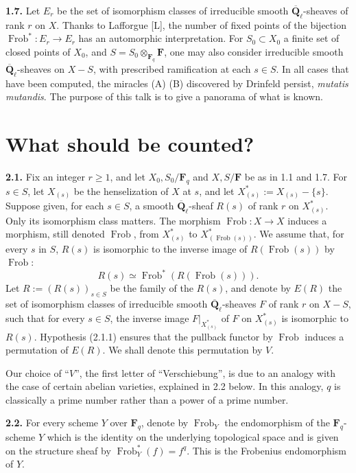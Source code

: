 \documentclass[11pt]{article}
\newcommand{\Fq}{\mathbf{F}_q}
\newcommand{\F}{\mathbf{F}}
\newcommand{\Qbl}{\overline{\mathbf{Q}}_{\ell}}
\newcommand{\Frob}{\operatorname{Frob}}
\newcommand{\para}[1]{\medskip\noindent\textbf{#1}\enspace}
\begin{document}
\para{1.7.} Let \(E_r\) be the set of isomorphism classes of irreducible smooth \(\Qbl\)-sheaves of rank \(r\) on \(X\). Thanks to Lafforgue [L], the number of fixed points of the bijection \(\Frob^*:E_r\to E_r\) has an automorphic interpretation. For \(S_0\subset X_0\) a finite set of closed points of \(X_0\), and \(S=S_0\otimes_{\Fq}\F\), one may also consider irreducible smooth \(\Qbl\)-sheaves on \(X-S\), with prescribed ramification at each \(s\in S\). In all cases that have been computed, the miracles (A) (B) discovered by Drinfeld persist, \textit{mutatis mutandis}. The purpose of this talk is to give a panorama of what is known.

\section{What should be counted?}

\para{2.1.} Fix an integer \(r\ge 1\), and let \(X_0,S_0/\Fq\) and \(X,S/\F\) be as in 1.1 and 1.7. For \(s\in S\), let \(X_{(s)}\) be the henselization of \(X\) at \(s\), and let \(X_{(s)}^*:=X_{(s)}-\{s\}\). Suppose given, for each \(s\in S\), a smooth \(\Qbl\)-sheaf \(R(s)\) of rank \(r\) on \(X_{(s)}^*\). Only its isomorphism class matters. The morphism \(\Frob:X\to X\) induces a morphism, still denoted \(\Frob\), from \(X_{(s)}^*\) to \(X_{(\Frob(s))}^*\). We assume that, for every \(s\) in \(S\), \(R(s)\) is isomorphic to the inverse image of \(R(\Frob(s))\) by \(\Frob\):
\begin{equation}
R(s)\simeq \Frob^*(R(\Frob(s))).
\tag{2.1.1}
\end{equation}
Let \(R:=(R(s))_{s\in S}\) be the family of the \(R(s)\), and denote by \(E(R)\) the set of isomorphism classes of irreducible smooth \(\Qbl\)-sheaves \(F\) of rank \(r\) on \(X-S\), such that for every \(s\in S\), the inverse image \(F|_{X_{(s)}^*}\) of \(F\) on \(X_{(s)}^*\) is isomorphic to \(R(s)\). Hypothesis (2.1.1) ensures that the pullback functor by \(\Frob\) induces a permutation of \(E(R)\). We shall denote this permutation by \(V\).

Our choice of ``\(V\)'', the first letter of ``Verschiebung'', is due to an analogy with the case of certain abelian varieties, explained in 2.2 below. In this analogy, \(q\) is classically a prime number rather than a power of a prime number.

\para{2.2.} For every scheme \(Y\) over \(\Fq\), denote by \(\Frob_Y\) the endomorphism of the \(\Fq\)-scheme \(Y\) which is the identity on the underlying topological space and is given on the structure sheaf by \(\Frob_Y^*(f)=f^q\). This is the Frobenius endomorphism of \(Y\).
\end{document}
